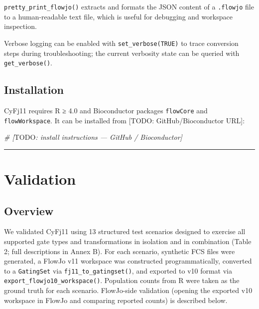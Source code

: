 \documentclass[
]{article}
\newenvironment{Shaded}{\begin{snugshade}}{\end{snugshade}}
\newcommand{\AlertTok}[1]{\textcolor[rgb]{0.94,0.16,0.16}{#1}}
\newcommand{\CommentTok}[1]{\textcolor[rgb]{0.56,0.35,0.01}{\textit{#1}}}
\begin{document}
\texttt{pretty\_print\_flowjo()} extracts and formats the JSON content
of a \texttt{.flowjo} file to a human-readable text file, which is
useful for debugging and workspace inspection.

Verbose logging can be enabled with \texttt{set\_verbose(TRUE)} to trace
conversion steps during troubleshooting; the current verbosity state can
be queried with \texttt{get\_verbose()}.

\subsection{Installation}\label{installation}

CyFj11 requires R ≥ 4.0 and Bioconductor packages \texttt{flowCore} and
\texttt{flowWorkspace}. It can be installed from
\textcolor{pending}{[TODO: GitHub/Bioconductor URL]}:

\begin{Shaded}
\begin{Highlighting}[]
\CommentTok{\# [}\AlertTok{TODO}\CommentTok{: install instructions — GitHub / Bioconductor]}
\end{Highlighting}
\end{Shaded}

\begin{center}\rule{0.5\linewidth}{0.5pt}\end{center}

\section{Validation}\label{validation}

\subsection{Overview}\label{overview}

We validated CyFj11 using 13 structured test scenarios designed to
exercise all supported gate types and transformations in isolation and
in combination (Table 2; full descriptions in Annex B). For each
scenario, synthetic FCS files were generated, a FlowJo v11 workspace was
constructed programmatically, converted to a \texttt{GatingSet} via
\texttt{fj11\_to\_gatingset()}, and exported to v10 format via
\texttt{export\_flowjo10\_workspace()}. Population counts from R were
taken as the ground truth for each scenario. FlowJo-side validation
(opening the exported v10 workspace in FlowJo and comparing reported
counts) is described below.
\end{document}
